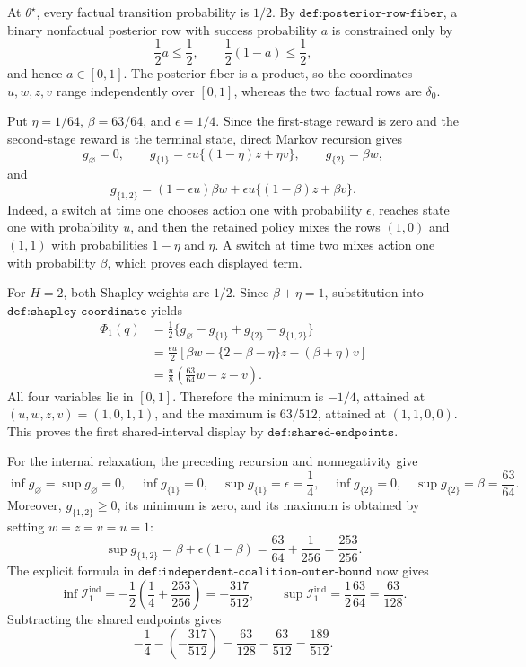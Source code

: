 At \(\theta^\star\), every factual transition probability is \(1/2\).  By \(\texttt{def:posterior-row-fiber}\), a binary nonfactual posterior row with success probability \(a\) is constrained only by
\[
 \frac12a\le\frac12,
 \qquad
 \frac12(1-a)\le\frac12,
\]
and hence \(a\in[0,1]\).  The posterior fiber is a product, so the coordinates \(u,w,z,v\) range independently over \([0,1]\), whereas the two factual rows are \(\delta_0\).

Put \(\eta=1/64\), \(\beta=63/64\), and \(\epsilon=1/4\).  Since the first-stage reward is zero and the second-stage reward is the terminal state, direct Markov recursion gives
\[
 g_\varnothing=0,
 \qquad
 g_{\{1\}}=\epsilon u\{(1-\eta)z+\eta v\},
 \qquad
 g_{\{2\}}=\beta w,
\]
and
\[
 g_{\{1,2\}}=(1-\epsilon u)\beta w
 +\epsilon u\{(1-\beta)z+\beta v\}.
\]
Indeed, a switch at time one chooses action one with probability \(\epsilon\), reaches state one with probability \(u\), and then the retained policy mixes the rows \((1,0)\) and \((1,1)\) with probabilities \(1-\eta\) and \(\eta\).  A switch at time two mixes action one with probability \(\beta\), which proves each displayed term.

For \(H=2\), both Shapley weights are \(1/2\).  Since \(\beta+\eta=1\), substitution into \(\texttt{def:shapley-coordinate}\) yields
\[
\begin{aligned}
 \Phi_1(q)
 &=\frac12\{g_\varnothing-g_{\{1\}}+g_{\{2\}}-g_{\{1,2\}}\}\\
 &=\frac{\epsilon u}{2}
 \left[\beta w-\{2-\beta-\eta\}z-(\beta+\eta)v\right]\\
 &=\frac{u}{8}\left(\frac{63}{64}w-z-v\right).
\end{aligned}
\]
All four variables lie in \([0,1]\).  Therefore the minimum is \(-1/4\), attained at \((u,w,z,v)=(1,0,1,1)\), and the maximum is \(63/512\), attained at \((1,1,0,0)\).  This proves the first shared-interval display by \(\texttt{def:shared-endpoints}\).

For the internal relaxation, the preceding recursion and nonnegativity give
\[
 \inf g_\varnothing=\sup g_\varnothing=0,
 \quad \inf g_{\{1\}}=0,
 \quad \sup g_{\{1\}}=\epsilon=\frac14,
 \quad \inf g_{\{2\}}=0,
 \quad \sup g_{\{2\}}=\beta=\frac{63}{64}.
\]
Moreover, \(g_{\{1,2\}}\ge0\), its minimum is zero, and its maximum is obtained by setting \(w=z=v=u=1\):
\[
 \sup g_{\{1,2\}}
 =\beta+\epsilon(1-\beta)
 =\frac{63}{64}+\frac1{256}
 =\frac{253}{256}.
\]
The explicit formula in \(\texttt{def:independent-coalition-outer-bound}\) now gives
\[
 \inf\mathcal I_1^{\mathrm{ind}}
 =-\frac12\left(\frac14+\frac{253}{256}\right)
 =-\frac{317}{512},
 \qquad
 \sup\mathcal I_1^{\mathrm{ind}}
 =\frac12\frac{63}{64}=\frac{63}{128}.
\]
Subtracting the shared endpoints gives
\[
 -\frac14-\left(-\frac{317}{512}\right)
 =\frac{63}{128}-\frac{63}{512}
 =\frac{189}{512}.
\]

